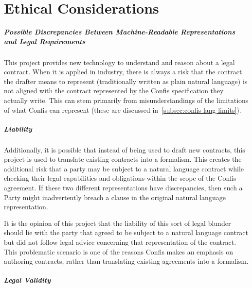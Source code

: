
\chapter{Ethical Considerations}\label{ch:ethical}


\paragraph{Possible Discrepancies Between Machine-Readable Representations and Legal Requirements}
\label{par:legal-discrepancies}

This project provides new technology to understand and reason about a legal contract.
When it is applied in industry, there is always a risk that the contract the drafter means to represent (traditionally written as plain natural language) is not aligned with the contract represented by the Confis specification they actually write.
This can stem primarily from misunderstandings of the limitations of what Confis can represent (these are discussed in~\autoref{subsec:confis-lang-limits}).

\paragraph{Liability}\label{par:liability}

Additionally, it is possible that instead of being used to draft new contracts, this project is used to translate existing contracts into a formalism.
This creates the additional risk that a party may be subject to a natural language contract while checking their legal capabilities and obligations within the scope of the Confis agreement.
If these two different representations have discrepancies, then such a Party might inadvertently breach a clause in the original natural language representation.

It is the opinion of this project that the liability of this sort of legal blunder should lie with the party that agreed to be subject to a natural language contract but did not follow legal advice concerning that representation of the contract.
This problematic scenario is one of the reasons Confis makes an emphasis on authoring contracts, rather than translating existing agreements into a formalism.

\paragraph{Legal Validity}\label{par:legal-validity}

